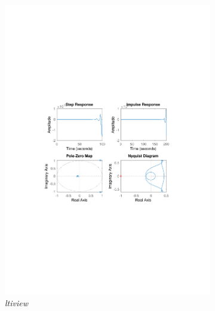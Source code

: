 \documentclass[]{article}
\begin{document}
\begin{figure}[ht]
\centering
\begin{subfigure}{.49\textwidth}
	\centering
	\includegraphics[trim= 10cm 8cm 10cm 8cm, scale=0.4]{figures/3-ARX-Ex2-cancel_out.pdf}
	\caption{\emph{ltiview}}
\end{subfigure}
\begin{subfigure}{.49\textwidth}
	\centering

\end{subfigure}
\end{figure}
\end{document}
